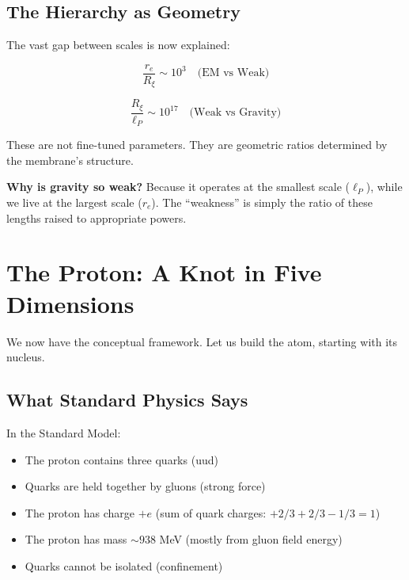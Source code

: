 \subsection{The Hierarchy as Geometry}
\label{subsec:hierarchy_geometry}

The vast gap between scales is now explained:

\begin{equation}
\frac{r_e}{R_\xi} \sim 10^3 \quad \text{(EM vs Weak)}
\end{equation}

\begin{equation}
\frac{R_\xi}{\ell_P} \sim 10^{17} \quad \text{(Weak vs Gravity)}
\end{equation}

These are not fine-tuned parameters. They are geometric ratios determined by the membrane's structure.

\textbf{Why is gravity so weak?} Because it operates at the smallest scale ($\ell_P$), while we live at the largest scale ($r_e$). The ``weakness'' is simply the ratio of these lengths raised to appropriate powers.


\section{The Proton: A Knot in Five Dimensions}
\label{sec:proton}

We now have the conceptual framework. Let us build the atom, starting with its nucleus.

\subsection{What Standard Physics Says}
\label{subsec:proton_standard}

In the Standard Model:
\begin{itemize}
    \item The proton contains three quarks (uud)
    \item Quarks are held together by gluons (strong force)
    \item The proton has charge $+e$ (sum of quark charges: $+2/3 + 2/3 - 1/3 = 1$)
    \item The proton has mass $\sim 938$ MeV (mostly from gluon field energy)
    \item Quarks cannot be isolated (confinement)
\end{itemize}

